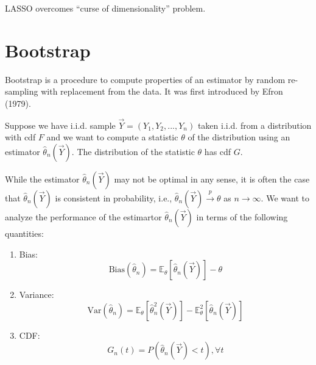 \documentclass[11pt]{elegantbook}
\begin{document}
LASSO overcomes ``curse of dimensionality'' problem.



























\chapter{Bootstrap}
Bootstrap is a procedure to compute properties of an estimator by random re-sampling with replacement from the data. It was first introduced by Efron (1979).

Suppose we have i.i.d. sample $\vec{Y}=(Y_1,Y_2,...,Y_n)$ taken i.i.d. from a distribution with cdf $F$ and we want to compute a statistic $\theta$ of the distribution using an estimator $\hat{\theta}_n(\vec{Y})$. The distribution of the statistic $\theta$ has cdf $G$.

While the estimator $\hat{\theta}_n(\vec{Y})$ may not be optimal in any sense, it is often the case that $\hat{\theta}_n(\vec{Y})$ is consistent in probability, i.e., $\hat{\theta}_n(\vec{Y}) \stackrel{p}{\longrightarrow} \theta$ as $n \rightarrow \infty$. We want to analyze the performance of the estimartor $\hat{\theta}_n(\vec{Y})$ in terms of the following quantities:
\begin{enumerate}[(1).]
    \item Bias: $$\text{Bias}(\hat{\theta}_n)= \mathbb{E}_{\theta}[\hat{\theta}_n(\vec{Y})]-\theta$$
    \item Variance: $$\text{Var}(\hat{\theta}_n)=\mathbb{E}_{\theta}[\hat{\theta}_n^2(\vec{Y})]-\mathbb{E}_{\theta}^2[\hat{\theta}_n(\vec{Y})]$$
    \item CDF: $$G_{n}(t)=P(\hat{\theta}_n(\vec{Y})<t),\forall t$$
\end{enumerate}
\end{document}
